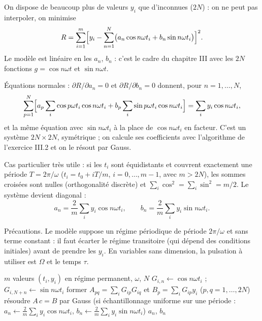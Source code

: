 \Pourquoi On dispose de beaucoup plus de valeurs $y_i$ que d'inconnues
($2N$) : on ne peut pas interpoler, on minimise
\[
  R = \sum_{i=1}^{m}\Bigl[y_i - \sum_{n=1}^{N}\bigl(a_n\cos n\omega t_i + b_n\sin n\omega t_i\bigr)\Bigr]^2 .
\]
Le modèle est linéaire en les $a_n$, $b_n$ : c'est le cadre du chapitre III avec
les $2N$ fonctions $g = \cos n\omega t$ et $\sin n\omega t$.

\Etapes
{} Équations normales : $\partial R/\partial a_n = 0$ et
$\partial R/\partial b_n = 0$ donnent, pour $n = 1, \dots, N$,
\[
  \sum_{p=1}^{N}\Bigl[a_p\sum_i\cos p\omega t_i\cos n\omega t_i
  + b_p\sum_i\sin p\omega t_i\cos n\omega t_i\Bigr] = \sum_i y_i\cos n\omega t_i ,
\]
et la même équation avec $\sin n\omega t_i$ à la place de $\cos n\omega t_i$
en facteur. C'est un système $2N \times 2N$, symétrique ; on calcule ses
coefficients avec l'algorithme de l'exercice III.2 et on le résout par Gauss.

 Cas particulier très utile : si les $t_i$ sont équidistants et
couvrent exactement une période $T = 2\pi/\omega$ ($t_i = t_0 + iT/m$,
$i = 0, \dots, m-1$, avec $m > 2N$), les sommes croisées sont nulles
(orthogonalité discrète) et $\sum_i\cos^2 = \sum_i\sin^2 = m/2$. Le système
devient diagonal :
\[
  a_n = \frac2m\sum_i y_i\cos n\omega t_i, \qquad
  b_n = \frac2m\sum_i y_i\sin n\omega t_i .
\]

 Précautions. Le modèle suppose un régime périodique de période
$2\pi/\omega$ et sans terme constant : il faut écarter le régime transitoire
(qui dépend des conditions initiales) avant de prendre les $y_i$. En variables
sans dimension, la pulsation à utiliser est $\Omega$ et le temps $\tau$.

\begin{algo}
  \Require $m$ valeurs $(t_i, y_i)$ en régime permanent, $\omega$, $N$
      \State $G_{i,n} \leftarrow \cos n\omega t_i$ ; $G_{i,N+n} \leftarrow \sin n\omega t_i$
    \EndFor
  \EndFor
  \State former $A_{pq} = \sum_i G_{ip}G_{iq}$ et $B_p = \sum_i G_{ip}y_i$ ($p, q = 1, \dots, 2N$) 
  \State résoudre $A\,c = B$ par Gauss 
  \Statex (si échantillonnage uniforme sur une période : $a_n \leftarrow \frac2m\sum_iy_i\cos n\omega t_i$, $b_n \leftarrow \frac2m\sum_iy_i\sin n\omega t_i$)
  \Print $a_n$, $b_n$
\end{algo}

